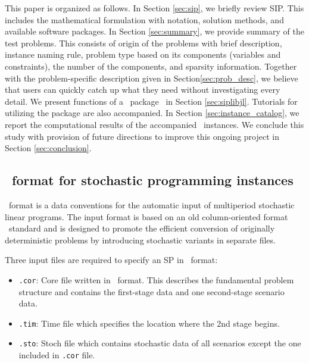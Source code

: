 
This paper is organized as follows. In Section \ref{sec:sip}, we briefly review SIP. This includes the mathematical formulation with notation, solution methods, and available software packages. In Section \ref{sec:summary}, we provide summary of the test problems. This consists of origin of the problems with brief description, instance naming rule, problem type based on its components (variables and constraints), the number of the components, and sparsity information. Together with the problem-specific description given in Section\ref{sec:prob_desc}, we believe that users can quickly catch up what they need without investigating every detail. We present functions of a \julia\ package \siplibjl\ in Section \ref{sec:siplibjl}. Tutorials for utilizing the package are also accompanied. In Section \ref{sec:instance_catalog}, we report the computational results of the accompanied \smps\ instances. We conclude this study with provision of future directions to improve this ongoing project in Section \ref{sec:conclusion}. 



\subsection{\smps\ format for stochastic programming instances} \label{subsec:smps}
\smps\ format \cite{SMPS} is a data conventions for the automatic input of multiperiod stochastic linear programs. The input format is based on an old column-oriented format \mpsx\ standard and is designed to promote the efficient conversion of originally deterministic problems by introducing stochastic variants in separate files. 

Three input files are required to specify an SP in \smps\ format:
\begin{itemize}
	\item \texttt{.cor}: Core file written in \mps\ format. This describes the fundamental problem structure and contains the first-stage data and one second-stage scenario data.
	\item \texttt{.tim}: Time file which specifies the location where the 2nd stage begins.
	\item \texttt{.sto}: Stoch file which contains stochastic data of all scenarios except the one included in \texttt{.cor} file.
\end{itemize}



